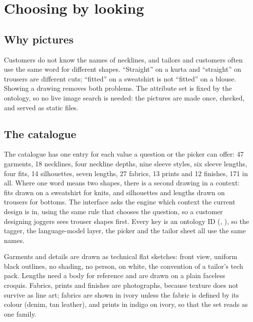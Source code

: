 \chapter{Choosing by looking}\label{ch:pictures}

\section{Why pictures}
Customers do not know the names of necklines, and tailors and customers often use the same word for different shapes. ``Straight'' on a kurta and ``straight'' on trousers are different cuts; ``fitted'' on a sweatshirt is not ``fitted'' on a blouse. Showing a drawing removes both problems. The attribute set is fixed by the ontology, so no live image search is needed: the pictures are made once, checked, and served as static files.

\section{The catalogue}
The catalogue has one entry for each value a question or the picker can offer: 47 garments, 18 necklines, four neckline depths, nine sleeve styles, six sleeve lengths, four fits, 14 silhouettes, seven lengths, 27 fabrics, 13 prints and 12 finishes, 171 in all. Where one word means two shapes, there is a second drawing in a context: fits drawn on a sweatshirt for knits, and silhouettes and lengths drawn on trousers for bottoms. The interface asks the engine which context the current design is in, using the same rule that chooses the question, so a customer designing joggers sees trouser shapes first. Every key is an ontology ID (, ), so the tagger, the language-model layer, the picker and the tailor sheet all use the same names.

Garments and details are drawn as technical flat sketches: front view, uniform black outlines, no shading, no person, on white, the convention of a tailor's tech pack. Lengths need a body for reference and are drawn on a plain faceless croquis. Fabrics, prints and finishes are photographs, because texture does not survive as line art; fabrics are shown in ivory unless the fabric is defined by its colour (denim, tan leather), and prints in indigo on ivory, so that the set reads as one family.

